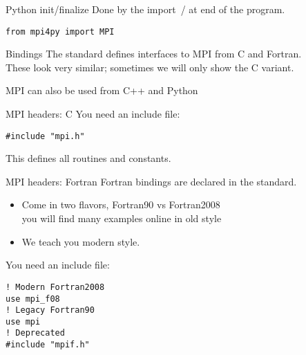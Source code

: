 \begin{python}
  \addtocounter{slidecount}{-1}
\begin{numberedframe}{Python init/finalize}
    Done by the import~/ at end of the program.
\begin{verbatim}
from mpi4py import MPI
\end{verbatim}
\end{numberedframe}
\end{python}

\begin{exerciseframe}[hello]
  
\end{exerciseframe}


\begin{numberedframe}{Bindings}
  The standard defines interfaces to MPI
  from C and Fortran.\\
  These look very similar;
  sometimes we will only show the C variant.

  MPI can also be used from C++ and Python
\end{numberedframe}

\begin{numberedframe}{MPI headers: C}
\label{sl:mpi-header-c}
You need an include file:
\begin{verbatim}
#include "mpi.h"
\end{verbatim}
This defines all routines and constants.
\end{numberedframe}

\begin{fortran}
  \addtocounter{slidecount}{-1}
\begin{numberedframe}{MPI headers: Fortran}
    \label{sl:mpi-header-f}
    Fortran bindings are declared in the standard.
    \begin{itemize}
    \item Come in two flavors, Fortran90 vs Fortran2008\\
      you will find many examples online in old style
    \item We teach you modern style.
    \end{itemize}
    You need an include file:
\begin{verbatim}
! Modern Fortran2008
use mpi_f08
! Legacy Fortran90
use mpi       
! Deprecated
#include "mpif.h"
\end{verbatim}
\end{numberedframe}
\end{fortran}

